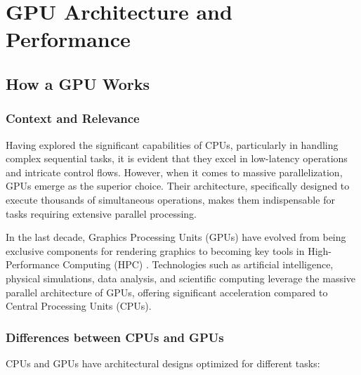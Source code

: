 
\chapter{GPU Architecture and Performance}
\label{ch::chapter4}

\vspace{-1cm}

\section{How a GPU Works}

\subsection*{Context and Relevance}
Having explored the significant capabilities of CPUs, particularly in handling complex sequential tasks, it is evident that they excel in low-latency operations and intricate control flows. However, when it comes to massive parallelization, GPUs emerge as the superior choice. Their architecture, specifically designed to execute thousands of simultaneous operations, makes them indispensable for tasks requiring extensive parallel processing.

In the last decade, Graphics Processing Units (GPUs) have evolved from being exclusive components for rendering graphics to becoming key tools in High-Performance Computing (HPC) \cite{GPUfundamentals}. Technologies such as artificial intelligence, physical simulations, data analysis, and scientific computing leverage the massive parallel architecture of GPUs, offering significant acceleration compared to Central Processing Units (CPUs).

\subsection*{Differences between CPUs and GPUs}
CPUs and GPUs have architectural designs optimized for different tasks:

